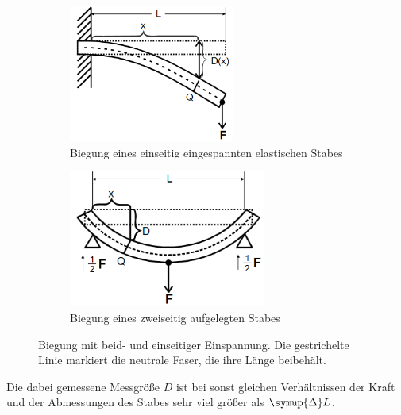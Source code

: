 \begin{figure}
    \begin{subfigure}{0.48\textwidth}
        \centering
        \caption{Biegung eines einseitig eingespannten elastischen Stabes}
        \label{fig:eins}
        \includegraphics[height=4.5cm]{pics/eins.png}
    \end{subfigure}
    \begin{subfigure}{0.48\textwidth}
        \centering
        \caption{Biegung eines zweiseitig aufgelegten Stabes}
        \label{fig:zwei}
        \includegraphics[height=4.5cm]{pics/zwei.png}
    \end{subfigure}
    \caption{Biegung mit beid- und einseitiger Einspannung.
    Die gestrichelte Linie markiert die neutrale Faser, die ihre Länge beibehält.}
    \label{fig:drei}
\end{figure}
Die dabei gemessene Messgröße $D$ ist bei sonst gleichen Verhältnissen der Kraft und der Abmessungen des Stabes sehr viel größer als $\symup{\Delta}L$.
